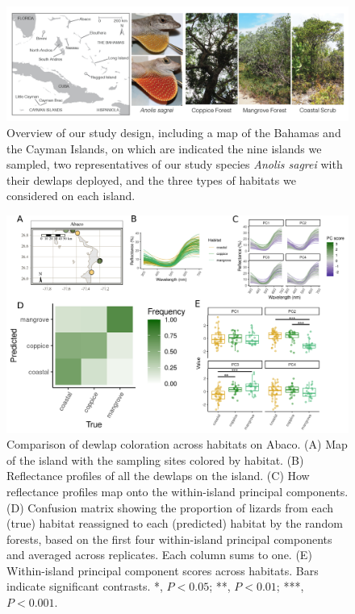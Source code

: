 \begin{figure}[H]
	\centering
	\includegraphics[width=\textwidth]{figures/overview.png}
	\caption{Overview of our study design, including a map of the Bahamas and the Cayman Islands, on which are indicated the nine islands we sampled, two representatives of our study species \textit{Anolis sagrei} with their dewlaps deployed, and the three types of habitats we considered on each island.}
	\label{fig:overview}
\end{figure}

\begin{figure}[H]
	\centering
	\includegraphics[width=\textwidth]{figures/Abaco.png}
	\caption{Comparison of dewlap coloration across habitats on Abaco. (A) Map of the island with the sampling sites colored by habitat. (B) Reflectance profiles of all the dewlaps on the island. (C) How reflectance profiles map onto the within-island principal components. (D) Confusion matrix showing the proportion of lizards from each (true) habitat reassigned to each (predicted) habitat by the random forests, based on the first four within-island principal components and averaged across replicates. Each column sums to one. (E) Within-island principal component scores across habitats. Bars indicate significant contrasts. *, $P < 0.05$; **, $P < 0.01$; ***, $P < 0.001$.}
	\label{fig:Abaco}
\end{figure}